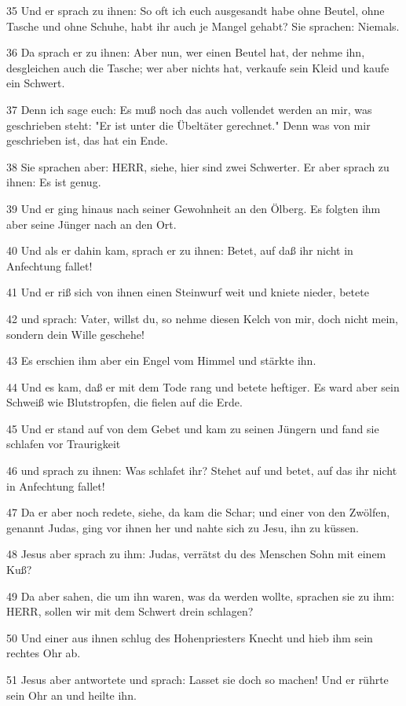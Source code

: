 \par 35 Und er sprach zu ihnen: So oft ich euch ausgesandt habe ohne Beutel, ohne Tasche und ohne Schuhe, habt ihr auch je Mangel gehabt? Sie sprachen: Niemals.
\par 36 Da sprach er zu ihnen: Aber nun, wer einen Beutel hat, der nehme ihn, desgleichen auch die Tasche; wer aber nichts hat, verkaufe sein Kleid und kaufe ein Schwert.
\par 37 Denn ich sage euch: Es muß noch das auch vollendet werden an mir, was geschrieben steht: "Er ist unter die Übeltäter gerechnet." Denn was von mir geschrieben ist, das hat ein Ende.
\par 38 Sie sprachen aber: HERR, siehe, hier sind zwei Schwerter. Er aber sprach zu ihnen: Es ist genug.
\par 39 Und er ging hinaus nach seiner Gewohnheit an den Ölberg. Es folgten ihm aber seine Jünger nach an den Ort.
\par 40 Und als er dahin kam, sprach er zu ihnen: Betet, auf daß ihr nicht in Anfechtung fallet!
\par 41 Und er riß sich von ihnen einen Steinwurf weit und kniete nieder, betete
\par 42 und sprach: Vater, willst du, so nehme diesen Kelch von mir, doch nicht mein, sondern dein Wille geschehe!
\par 43 Es erschien ihm aber ein Engel vom Himmel und stärkte ihn.
\par 44 Und es kam, daß er mit dem Tode rang und betete heftiger. Es ward aber sein Schweiß wie Blutstropfen, die fielen auf die Erde.
\par 45 Und er stand auf von dem Gebet und kam zu seinen Jüngern und fand sie schlafen vor Traurigkeit
\par 46 und sprach zu ihnen: Was schlafet ihr? Stehet auf und betet, auf das ihr nicht in Anfechtung fallet!
\par 47 Da er aber noch redete, siehe, da kam die Schar; und einer von den Zwölfen, genannt Judas, ging vor ihnen her und nahte sich zu Jesu, ihn zu küssen.
\par 48 Jesus aber sprach zu ihm: Judas, verrätst du des Menschen Sohn mit einem Kuß?
\par 49 Da aber sahen, die um ihn waren, was da werden wollte, sprachen sie zu ihm: HERR, sollen wir mit dem Schwert drein schlagen?
\par 50 Und einer aus ihnen schlug des Hohenpriesters Knecht und hieb ihm sein rechtes Ohr ab.
\par 51 Jesus aber antwortete und sprach: Lasset sie doch so machen! Und er rührte sein Ohr an und heilte ihn.
